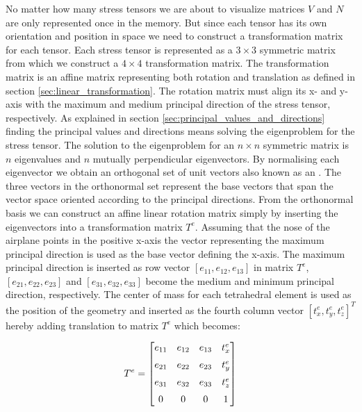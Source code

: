 No matter how many stress tensors we are about to visualize matrices $V$
and $N$ are only represented once in the memory. But since each tensor
has its own orientation and position in space we need to construct a
transformation matrix for each tensor. 
%
Each stress tensor is represented as a $3 \times 3$
symmetric matrix from which we construct a $4 \times 4$ transformation matrix. 
The transformation matrix is an
affine matrix representing both rotation and translation as defined in
section \vref{sec:linear_transformation}.
%
The rotation matrix must align its x- and y-axis with the
maximum and medium principal direction of the stress tensor, respectively.
As explained in section
\vref{sec:principal_values_and_directions} finding the principal
values and directions means solving the eigenproblem for the stress
tensor. The solution to the
eigenproblem for an $n \times n$ 
symmetric matrix is $n$ eigenvalues and $n$ mutually
perpendicular eigenvectors. By normalising each eigenvector
we obtain an orthogonal set of unit
vectors also known as an . The three vectors in
the orthonormal set represent the base vectors that span the vector
space oriented according to 
the principal directions. From the orthonormal
basis we can construct an affine linear rotation matrix simply by
inserting the eigenvectors into a transformation matrix $T^e$. Assuming
that the nose of the airplane points in the positive x-axis the vector
representing the maximum principal direction is used as the 
base vector defining the x-axis. The maximum principal direction is
inserted as row vector $[e_{11}, e_{12}, e_{13}]$ in matrix $T^e$,
$[e_{21}, e_{22}, e_{23}]$ and  $[e_{31}, e_{32}, e_{33}]$ become the medium and
minimum principal direction, respectively. The center of mass for each
tetrahedral element is used as the position of the geometry and
inserted as the fourth column vector $[t^e_x, t^e_y, t^e_z]^T$ hereby
adding translation to matrix $T^e$ which becomes: 

\begin{equation}
\label{eq:tensor_transformation_matrix}
T^e = 
\begin{bmatrix} 
e_{11} & e_{12} & e_{13} & t^e_x \vspace{2mm} \\
e_{21} & e_{22} & e_{23} & t^e_y \vspace{2mm} \\
e_{31} & e_{32} & e_{33} & t^e_z \vspace{2mm} \\
0 & 0 & 0 & 1 
\end{bmatrix} 
\end{equation} 

